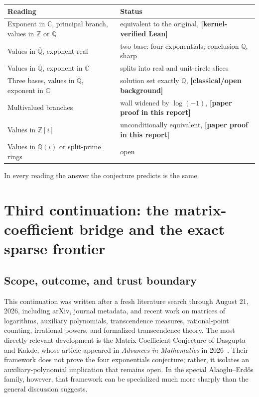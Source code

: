 \documentclass[11pt,oneside]{article}
\theoremstyle{definition}
\theoremstyle{remark}
\newcommand{\Z}{\mathbb Z}
\newcommand{\Q}{\mathbb Q}
\newcommand{\C}{\mathbb C}
\newcommand{\Abar}{\overline{\mathbb Q}}
\newcommand{\Qbar}{\Abar}
\newcommand{\statuslean}{\textcolor{leanblue}{\textbf{[kernel-verified Lean]}}}
\newcommand{\statusnew}{\textcolor{newgreen}{\textbf{[paper proof in this report]}}}
\newcommand{\statusknown}{\textcolor{classicalgray}{\textbf{[classical/open background]}}}
\begin{document}
\begin{center}
\begin{tabularx}{\textwidth}{@{}>{\raggedright\arraybackslash}p{}>{\raggedright\arraybackslash}X@{}}
\toprule
Reading & Status \\
\midrule
Exponent in $\C$, principal branch, values in $\Z$ or $\Q$ &
equivalent to the original, \statuslean \\
Values in $\Qbar$, exponent real & two-base: four exponentials; conclusion $\Q$, sharp \\
Values in $\Qbar$, exponent in $\C$ & splits into real and unit-circle slices \\
Three bases, values in $\Qbar$, exponent in $\C$ & solution set exactly $\Q$, \statusknown \\
Multivalued branches & wall widened by $\log(-1)$, \statusnew \\
Values in $\Z[i]$ & unconditionally equivalent, \statusnew \\
Values in $\Q(i)$ or split-prime rings & open \\
\bottomrule
\end{tabularx}
\end{center}

In every reading the answer the conjecture predicts is the same.

\clearpage

\section{Third continuation: the matrix-coefficient bridge and the exact sparse frontier}
\label{sec:continuation3}

\subsection{Scope, outcome, and trust boundary}

This continuation was written after a fresh literature search through August 21, 2026,
including arXiv, journal metadata, and recent work on matrices of logarithms, auxiliary
polynomials, transcendence measures, rational-point counting, irrational powers, and formalized
transcendence theory.  The most directly relevant development is the Matrix Coefficient
Conjecture of Dasgupta and Kakde, whose article appeared in \emph{Advances in Mathematics} in
2026~\cite{DasguptaKakde2026}.  Their framework does not prove the four exponentials
conjecture; rather, it isolates an auxiliary-polynomial implication that remains open.  In the
special Alaoglu--Erd\H{o}s family, however, that framework can be specialized much more
sharply than the general discussion suggests.
\end{document}
